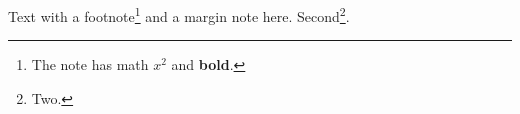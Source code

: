 \documentclass{article}
\begin{document}
Text with a footnote\footnote{The note has math $x^2$ and \textbf{bold}.} and a margin
note here. Second\footnote{Two.}.
\end{document}
